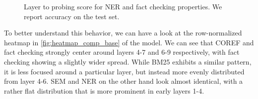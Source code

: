 \begin{figure}[!h]
    \centering
    \begin{subfigure}{\textwidth}
        \centering
    \end{subfigure}

    \begin{subfigure}{\textwidth}
        \centering
    \end{subfigure}

    \caption{Layer to probing score for NER and fact checking properties. We report accuracy on the test set.}
\end{figure}

To better understand this behavior, we can have a look at the row-normalized heatmap in \autoref{fig:heatmap_comp_base} of the  model. We can see that COREF and fact checking strongly center around layers 4-7 and 6-9 respectively, with fact checking showing a slightly wider spread. While BM25 exhibits a similar pattern, it is less focused around a particular layer, but instead more evenly distributed from layer 4-6. SEM and NER on the other hand look almost identical, with a rather flat distribution that is more prominent in early layers 1-4.

